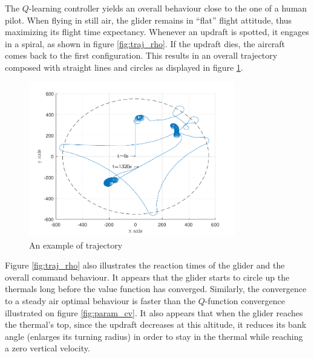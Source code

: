 \documentclass{ifacconf}
\begin{document}
The $Q$-learning controller yields an overall behaviour close to the one of a human pilot. When flying in still air, the glider remains in ``flat'' flight attitude, thus maximizing its flight time expectancy. Whenever an updraft is spotted, it engages in a spiral, as shown in figure \ref{fig:traj_rho}. If the updraft dies, the aircraft comes back to the first configuration. This results in an overall trajectory composed with straight lines and circles as displayed in figure \ref{fig:full_traj}.

\begin{figure}
\begin{center}
 \includegraphics[width=9cm]{img/full_traj.pdf}
\end{center}
\caption{An example of trajectory}
\label{fig:full_traj}
\end{figure}

Figure \ref{fig:traj_rho} also illustrates the reaction times of the glider and the overall command behaviour. It appears that the glider starts to circle up the thermals long before the value function has converged. Similarly, the convergence to a steady air optimal behaviour is faster than the $Q$-function convergence illustrated on figure \ref{fig:param_cv}. It also appears that when the glider reaches the thermal's top, since the updraft decreases at this altitude, it reduces its bank angle (enlarges its turning radius) in order to stay in the thermal while reaching a zero vertical velocity.

\end{document}
